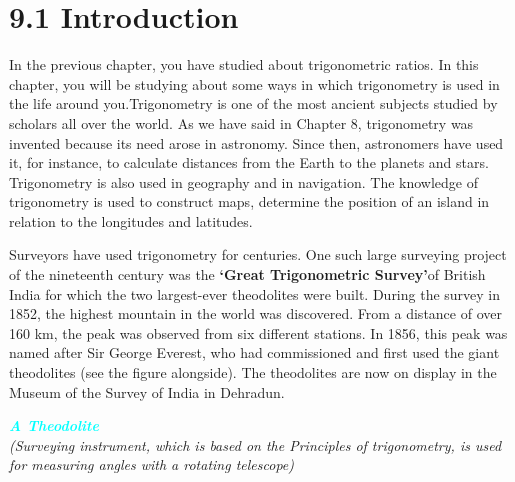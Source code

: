 \documentclass[12pt]{article}
\renewcommand{\headrulewidth}{0pt}
\begin{document}
\section*{9.1 Introduction}
\vspace{-1em}
In the previous chapter, you have studied about trigonometric ratios. In this chapter, you will be studying about some ways in which trigonometry is used in the life around you.Trigonometry is one of the most ancient subjects studied by scholars all over the world. As we have said in Chapter 8, trigonometry was invented because its need arose in astronomy. Since then, astronomers have used it, for instance, to calculate distances from the Earth to the planets and stars. Trigonometry is also used in geography and in navigation. The knowledge of trigonometry is used to construct maps, determine the position of an island in relation to the longitudes and latitudes.
\noindent
\begin{tcolorbox}[
    colback=white,
    colframe=cyan!60!black,
    boxrule=0.6pt,
    arc=2pt,
    width=\textwidth,
    left=10pt, right=5pt, top=10pt, bottom=6pt,
    enhanced
]



\begin{minipage}[t]{0.55\textwidth}
\color{black}
\small
Surveyors have used trigonometry for centuries. One such large surveying project of the nineteenth century was the \textbf{‘Great Trigonometric Survey’}of British India for which the two largest-ever theodolites were built. During the survey in 1852, the highest mountain in the world was discovered. From a distance of over 160 km, the peak was observed from six different stations. In 1856, this peak was named after Sir George Everest, who had commissioned and first used the giant theodolites (see the figure alongside). The theodolites are now on display in the Museum of the Survey of India in Dehradun.

\end{minipage}
\hspace{7pt}
\begin{minipage}[t][5.6cm][b]{0.44\textwidth}
\centering
\textit{ \textcolor{cyan}{\textbf{A Theodolite \\}}
(Surveying instrument, which is based on the Principles of trigonometry, is used for measuring angles with a rotating telescope)}
\end{minipage}

\end{tcolorbox}
\newpage{}
\pagestyle{fancy}
\fancyhf{}
\renewcommand{\headrulewidth}{0pt}
\makeatletter
\def\headrule{%
  {\color{cyan}%
   \hrule width\headwidth height 1pt \vskip-1pt}
}
\makeatother
\end{document}
